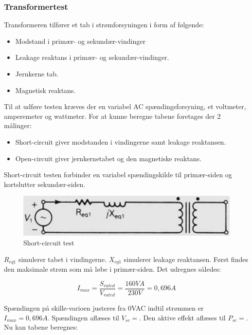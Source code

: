 \subsubsection{Transformertest}
Transformeren tilfører et tab i strømforsyningen i form af følgende:
\begin{itemize}
\item Modstand i primær- og sekundær-vindinger
\item Leakage reaktans i primær- og sekundær-vindinger.
\item Jernkerne tab.
\item Magnetisk reaktans.
\end{itemize}

Til at udføre testen kræves der en variabel AC spændingsforsyning, et voltmeter, amperemeter og wattmeter. For at kunne beregne tabene foretages der 2 målinger:
\begin{itemize}
\item Short-circuit giver modstanden i vindingerne samt leakage reaktansen.
\item Open-circuit giver jernkernetabet og den magnetiske reaktans.
\end{itemize}


Short-circuit testen forbinder en variabel spændingskilde til primær-siden og kortslutter sekundær-siden.

\begin{figure}[H]
	\centering
	\includegraphics[scale=0.25]{../Hardware/PSU/Transformer/ShortCircuit}
	\caption{Short-circuit test}
	\label{photo:ShortCircuit}
\end{figure}

$R_{eq1}$ simulerer tabet i vindingerne. $X_{eq1}$ simulerer leakage reaktansen. Først findes den maksimale strøm som må løbe i primær-siden. Det udregnes således:

\begin{equation}
	I_{max} = \frac{S_{rated}}{V_{rated}} = \frac{160VA}{230V} = 0,696A
\end{equation} 

Spændingen på skille-varioen justeres fra 0VAC indtil strømmen er $I_{max} = 0,696A$. Spændingen aflæses til $V_{sc} = $. Den aktive effekt aflæses til $P_{sc} = $. Nu kan tabene beregnes:

